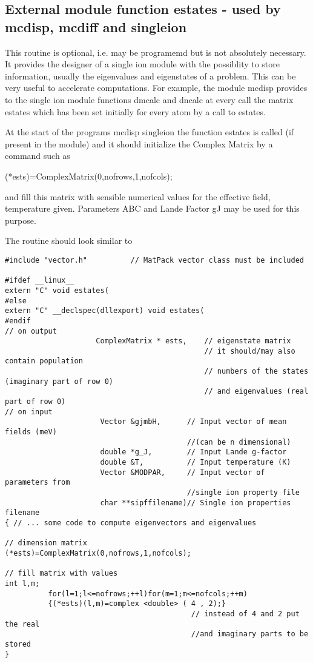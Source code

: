 \subsection{External module function {\prg estates} - used by {\prg mcdisp}, {\prg %
mcdiff} and {\prg singleion}}

This routine is optional, i.e. may be programemd but is not absolutely necessary. It provides the designer of a %
single ion module
with the possiblity to store information, usually the eigenvalues and eigenstates of a problem. This can be very %
useful to accelerate computations. 
For example, the module {\prg mcdisp} provides to the single ion module functions {\prg dmcalc} and {\prg dncalc}
at every call the matrix {\prg estates} which has been set initially for every atom
by a call to {\prg estates}.

At the start of the programs {\prg mcdisp} {\prg singleion} the function {\prg estates}
is called (if present in the module) and it should initialize the Complex Matrix by a command such as

{\prg (*ests)=ComplexMatrix(0,nofrows,1,nofcols);} 

and fill this matrix with sensible numerical values for the effective field, temperature given.
Parameters {\prg ABC} and Lande Factor {\prg gJ} may be used for this purpose. 

The routine should look similar to
{\footnotesize
\begin{verbatim}
#include "vector.h"          // MatPack vector class must be included

#ifdef __linux__
extern "C" void estates(
#else
extern "C" __declspec(dllexport) void estates(
#endif
// on output
                     ComplexMatrix * ests,    // eigenstate matrix      
                                              // it should/may also contain population 
                                              // numbers of the states (imaginary part of row 0)
                                              // and eigenvalues (real part of row 0)
// on input
                      Vector &gjmbH,      // Input vector of mean fields (meV) 
					                      //(can be n dimensional) 
                      double *g_J,        // Input Lande g-factor
                      double &T,          // Input temperature (K)
                      Vector &MODPAR,     // Input vector of parameters from 
					                      //single ion property file
                      char **sipffilename)// Single ion properties filename                      
{ // ... some code to compute eigenvectors and eigenvalues

// dimension matrix
(*ests)=ComplexMatrix(0,nofrows,1,nofcols);

// fill matrix with values
int l,m;
          for(l=1;l<=nofrows;++l)for(m=1;m<=nofcols;++m)
          {(*ests)(l,m)=complex <double> ( 4 , 2);}
                                           // instead of 4 and 2 put the real 
										   //and imaginary parts to be stored
}
\end{verbatim}
}


